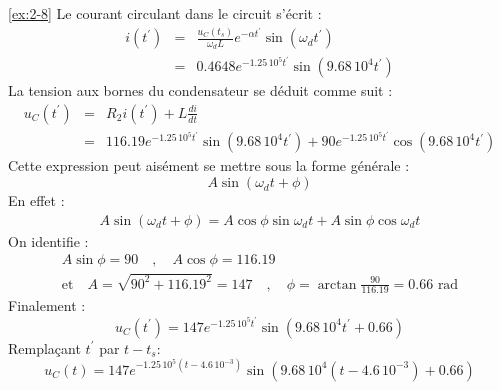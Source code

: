 \begin{solexercise}{\ref{ex:2-8}}
Le courant circulant dans le circuit s'\'ecrit :
\begin{eqnarray*}
	i(t^{'})&=&\frac{u_C(t_s)}{\omega_d L}e^{-\alpha t^{'}}\sin (\omega_d
	t^{'})\\
	& = & 0.4648 e^{-1.25\, 10^5 t^{'}}\sin (9.68\, 10^4 t^{'})
\end{eqnarray*}
La tension aux bornes du condensateur se d\'eduit comme suit :
\begin{eqnarray*}
	u_C(t^{'})& = &R_2 i(t^{'})+L\frac{di}{dt}\\
	& = & 116.19 e^{-1.25\, 10^5 t^{'}}\sin (9.68\, 10^4 t^{'}) + 90 e^{-1.25\, 10^5 t^{'}}\cos (9.68\, 10^4 t^{'})
\end{eqnarray*}
Cette expression peut ais\'ement se mettre sous la forme g\'en\'erale :
\[ A\sin (\omega_d t + \phi)\]
En effet :
\begin{align*}
A\sin (\omega_d t + \phi)=A \cos \phi \sin \omega_d t + A\sin \phi \cos
\omega_d t
\end{align*}
On identifie :
\begin{align*}
A\sin \phi = 90 \quad , \quad A \cos \phi =  116.19\\
\mbox{et} \quad A = \sqrt{90^2+116.19^2}=147 \quad , \quad \phi =
\arctan \frac{90}{116.19}=0.66 \, \, \text{rad}
\end{align*}
Finalement :
\[u_C(t^{'})=147 e^{-1.25\, 10^5 t^{'}}\sin (9.68\, 10^4 t^{'}+0.66)\]
Rempla\c{c}ant $t^{'}$ par $t-t_s$:
\[u_C(t)=147 e^{-1.25\, 10^5 (t-4.6\, 10^{-3})}\sin (9.68\, 10^4(t-4.6\, 10^{-3})+0.66)\]
\end{solexercise}

